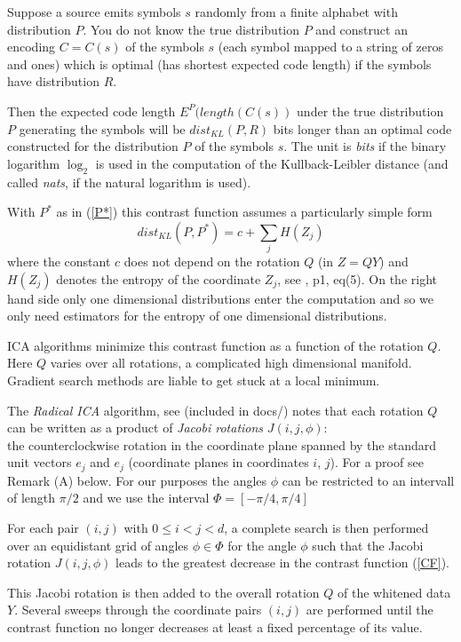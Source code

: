 \documentclass[
10pt,
fleqn,
nosumlimits,
nointlimits,
nonamelimits
]
{article}
\begin{document}
Suppose a source emits symbols $s$ randomly from a finite alphabet with distribution $P$.
You do not know the true distribution $P$ and construct an encoding $C=C(s)$ of the symbols $s$ 
(each symbol mapped to a string of zeros and ones)
which is optimal (has shortest expected code length) if the symbols have distribution $R$.

Then the expected code length $E^P(length(C(s))$ under the true distribution $P$ generating the symbols
will be $dist_{KL}(P,R)$ bits longer than an optimal code constructed
for the distribution $P$ of the symbols $s$. The unit is \textit{bits} if the binary logarithm $\log_2$ is used in
the computation of the Kullback-Leibler distance (and called \textit{nats}, if the natural logarithm is used).

\noindent
With $P^*$ as in (\ref{P*}) this contrast function assumes a particularly simple form
%
\begin{equation}
\label{CF}
dist_{KL}(P,P^*) = c + \sum_j H(Z_j)
\end{equation}
%
where the constant $c$ does not depend on the rotation $Q$ (in $Z=QY$) and $H(Z_j)$ denotes the entropy of the
coordinate $Z_j$, see \cite{MilFish}, p1, eq(5). On the right hand side only one dimensional distributions enter the 
computation and so we only need estimators for the entropy of one dimensional distributions.

ICA algorithms minimize this contrast function as a function of the rotation $Q$. Here $Q$ varies over all
rotations, a complicated high dimensional manifold. Gradient search methods are liable to get stuck at a
local minimum.

The \textit{Radical ICA} algorithm, see \cite{MilFish} (included in docs/) notes that each rotation
$Q$ can be written as a product of \textit{Jacobi rotations} $J(i,j,\phi)$:\\
the counterclockwise rotation in the coordinate plane spanned by the standard unit vectors $e_j$ and $e_j$ 
(coordinate planes in coordinates $i$, $j$). For a proof see Remark (A) below.
For our purposes the angles $\phi$ can be restricted to an intervall of length $\pi/2$ and we use the interval 
$\Phi=[-\pi/4,\pi/4]$

For each pair $(i,j)$ with $0\leq i<j<d$, a complete search is then performed over an equidistant grid
of angles $\phi\in\Phi$ for the angle $\phi$ such that the Jacobi rotation $J(i,j,\phi)$ leads to the greatest
decrease in the contrast function (\ref{CF}). 

This Jacobi rotation is then added to the overall rotation $Q$
of the whitened data $Y$. Several sweeps through the coordinate pairs $(i,j)$ are performed until the contrast
function no longer decreases at least a fixed percentage of its value.
\end{document}
